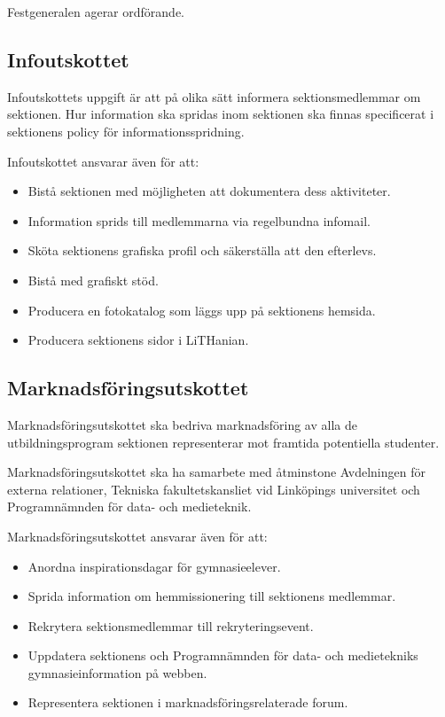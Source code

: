 \documentclass{datateknologsektionen-document}
\begin{document}
Festgeneralen agerar ordförande.

\subsection{Infoutskottet}
\label{infoutskottet}
Infoutskottets uppgift är att på olika sätt informera sektionsmedlemmar om sektionen.
Hur information ska spridas inom sektionen ska finnas specificerat i sektionens
policy för informationsspridning.

Infoutskottet ansvarar även för att:
\begin{itemize}
  \item Bistå sektionen med möjligheten att dokumentera dess aktiviteter.
  \item Information sprids till medlemmarna via regelbundna infomail.
  \item Sköta sektionens grafiska profil och säkerställa att den efterlevs.
  \item Bistå med grafiskt stöd.
  \item Producera en fotokatalog som läggs upp på sektionens hemsida.
  \item Producera sektionens sidor i LiTHanian.
\end{itemize}

\subsection{Marknadsföringsutskottet}
Marknadsföringsutskottet ska bedriva marknadsföring av alla de utbildningsprogram sektionen representerar mot framtida potentiella studenter.

Marknadsföringsutskottet ska ha samarbete med åtminstone Avdelningen för externa relationer,
Tekniska fakultetskansliet vid Linköpings universitet och Programnämnden för data- och medieteknik.

Marknadsföringsutskottet ansvarar även för att:
\begin{itemize}
  \item Anordna inspirationsdagar för gymnasieelever.
  \item Sprida information om hemmissionering till sektionens medlemmar.
  \item Rekrytera sektionsmedlemmar till rekryteringsevent.
  \item Uppdatera sektionens och Programnämnden för data- och medietekniks gymnasieinformation på webben.
  \item Representera sektionen i marknadsföringsrelaterade forum.
\end{itemize}
\end{document}
